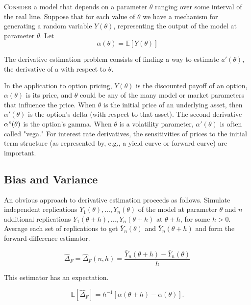 \lettrine[lines=2, lhang=0.1]{C}{onsider} a model that depends on a parameter \(\theta\) ranging over some interval of the real line. Suppose that for each value of \(\theta\) we have a mechanism for generating a random variable \(Y(\theta)\), representing the output of the model at
parameter \(\theta\). Let
\begin{equation}
	\alpha(\theta) = \mathbb{E}[Y(\theta)]
	\label{eq:ExpectedModelOutput} \nonumber
\end{equation}

The derivative estimation problem consists of finding a way to estimate \(a'(\theta)\), the derivative of a with respect to \(\theta\).

In the application to option pricing, \(Y(\theta)\) is the discounted payoff of an option, \(\alpha(\theta)\) is its price, and \(\theta\) could be any of the many model or market parameters that influence the price. When \(\theta\) is the initial price of an underlying asset, then \(\alpha'(\theta)\) is the option's delta (with respect to that asset). The second derivative \(\alpha"(\theta)\) is the option's gamma. When \(\theta\) is a volatility parameter, \(\alpha'(\theta)\) is often called "vega." For interest rate derivatives, the sensitivities of prices to the initial term structure (as represented by, e.g., a yield curve or forward curve) are important.

\subsection{Bias and Variance}

An obvious approach to derivative estimation proceeds as follows. Simulate independent replications \(Y_1(\theta),\dots,Y_n(\theta)\) of the model at parameter \(\theta\) and \(n\) additional replications \(Y_1(\theta+h),\dots,Y_n(\theta+h)\) at \(\theta + h\), for some \(h>0\). Average each set of replications to get \(\bar{Y}_n(\theta)\) and \(\bar{Y}_n(\theta + h)\) and form the forward-difference estimator.

\begin{equation}
	\hat{\Delta}_F = \hat{\Delta}_F(n,h) = \frac{\bar{Y}_n(\theta+h) - \bar{Y}_n(\theta)}{h}
	\label{eq:ForwardDiffEstimator}
\end{equation}

This estimator has an expectation.

\begin{equation}
	\mathbb{E}[\hat{\Delta}_F] = h^{-1}[\alpha(\theta+h) - \alpha(\theta)].
	\label{eq:ForwardDiffExpectation}
\end{equation}

